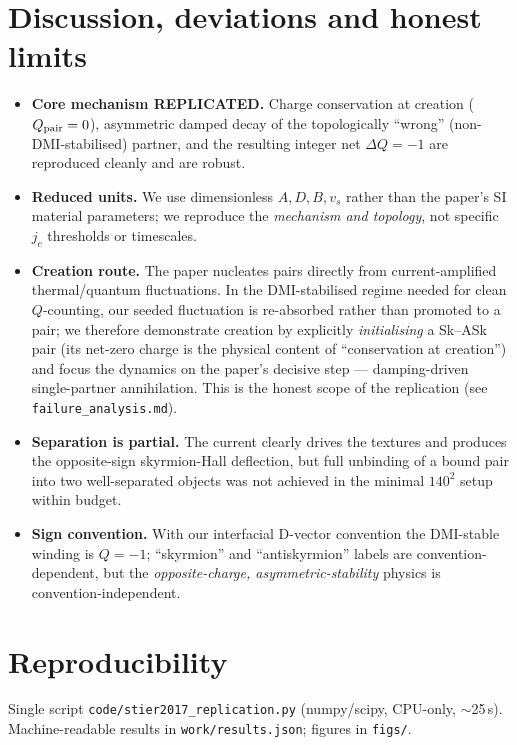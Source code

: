 \documentclass[11pt]{article}
\begin{document}
\section{Discussion, deviations and honest limits}
\begin{itemize}
\item \textbf{Core mechanism REPLICATED.} Charge conservation at creation
($Q_{\rm pair}=0$), asymmetric damped decay of the topologically ``wrong''
(non-DMI-stabilised) partner, and the resulting integer net $\Delta Q=-1$ are
reproduced cleanly and are robust.
\item \textbf{Reduced units.} We use dimensionless $A,D,B,v_s$ rather than the
paper's SI material parameters; we reproduce the \emph{mechanism and topology},
not specific $j_c$ thresholds or timescales.
\item \textbf{Creation route.} The paper nucleates pairs directly from
current-amplified thermal/quantum fluctuations. In the DMI-stabilised regime
needed for clean $Q$-counting, our seeded fluctuation is re-absorbed rather than
promoted to a pair; we therefore demonstrate creation by explicitly
\emph{initialising} a Sk--ASk pair (its net-zero charge is the physical content
of ``conservation at creation'') and focus the dynamics on the paper's decisive
step --- damping-driven single-partner annihilation. This is the honest scope of
the replication (see \texttt{failure\_analysis.md}).
\item \textbf{Separation is partial.} The current clearly drives the textures
and produces the opposite-sign skyrmion-Hall deflection, but full unbinding of a
bound pair into two well-separated objects was not achieved in the minimal
$140^2$ setup within budget.
\item \textbf{Sign convention.} With our interfacial D-vector convention the
DMI-stable winding is $Q=-1$; ``skyrmion'' and ``antiskyrmion'' labels are
convention-dependent, but the \emph{opposite-charge, asymmetric-stability}
physics is convention-independent.
\end{itemize}

\section*{Reproducibility}
Single script \texttt{code/stier2017\_replication.py} (numpy/scipy, CPU-only,
$\sim$25\,s). Machine-readable results in \texttt{work/results.json}; figures in
\texttt{figs/}.
\end{document}

